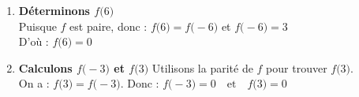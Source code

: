 \documentclass[10pt, a4paper]{article}
\begin{document}
\begin{Solution}[APPLICATION][6]
\begin{enumerate}[leftmargin=*,itemsep=0.5pt]
\begin{center}
    \end{center}

    \item \textbf{Déterminons $f\big(6\big)$} \\
     Puisque  $f$ est paire, donc : $f\big(6\big) = f\big(-6\big)$
    et $f\big(-6\big) = 3$ \\
    D'où : $f\big(6\big)=0$

    \item \textbf{Calculons $f\big(-3\big)$ et $f\big(3\big)$}
    Utilisons la parité de $f$ pour trouver $f\big(3\big)$. \\
    On a :  $f\big(3\big) = f\big(-3\big)$.
    Donc : $f\big(-3\big) = 0 \quad \text{et} \quad f\big(3\big) = 0$

\end{enumerate}
\end{Solution}
\end{document}
